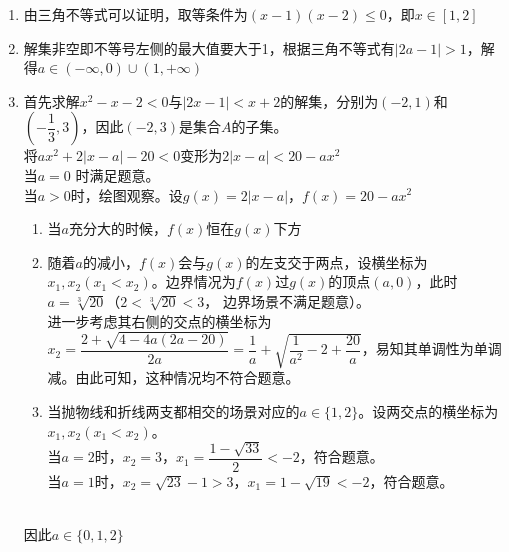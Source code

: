 \begin{enumerate}
\begin{jieda}
\begin{enumerate}[(1)]
    \item 由三角不等式可以证明，取等条件为$(x-1)(x-2) \leq 0$，即$x \in [1, 2]$
    \item 解集非空即不等号左侧的最大值要大于1，根据三角不等式有$|2a-1| > 1$，解得$a \in (-\infty, 0) \cup (1, +\infty)$
    \item 首先求解$x^2-x-2 < 0$与$|2x-1| < x+2$的解集，分别为$(-2, 1)$和$(-\dfrac{1}{3}, 3)$，因此$(-2, 3)$是集合$A$的子集。\\
    将$ax^2+2|x-a|-20<0$变形为$2|x-a| < 20 - ax^2$ \\
    当$a = 0$ 时满足题意。\\
    当$a > 0$时，绘图观察。设$g(x) = 2|x-a|$，$f(x) = 20 - ax^2$
    \begin{enumerate}
        \item 当$a$充分大的时候，$f(x)$恒在$g(x)$下方
        \item 随着$a$的减小，$f(x)$会与$g(x)$的左支交于两点，设横坐标为$x_1, x_2(x_1 < x_2)$。边界情况为$f(x)$过$g(x)$的顶点$(a, 0)$，此时$a = \sqrt[3]{20}$（$2 < \sqrt[3]{20} < 3$， 边界场景不满足题意）。\\
        进一步考虑其右侧的交点的横坐标为$x_2 = \dfrac{2+\sqrt{4-4a(2a-20)}}{2a} = \dfrac{1}{a} + \sqrt{\dfrac{1}{a^2} - 2 + \dfrac{20}{a}}$，易知其单调性为单调减。由此可知，这种情况均不符合题意。
        \item 当抛物线和折线两支都相交的场景对应的$a \in \{1, 2\}$。设两交点的横坐标为$x_1, x_2(x_1 < x_2)$。\\
        当$a = 2$时，$x_2 = 3$，$x_1 = \dfrac{1-\sqrt{33}}{2} < -2$，符合题意。\\
        当$a = 1$时，$x_2 = \sqrt{23}-1 > 3$，$x_1 = 1-\sqrt{19} < -2$，符合题意。
    \end{enumerate}
    \\
    因此$a \in \{0, 1, 2\}$
\end{enumerate}
\end{jieda} 

\end{enumerate}
\clearpage


